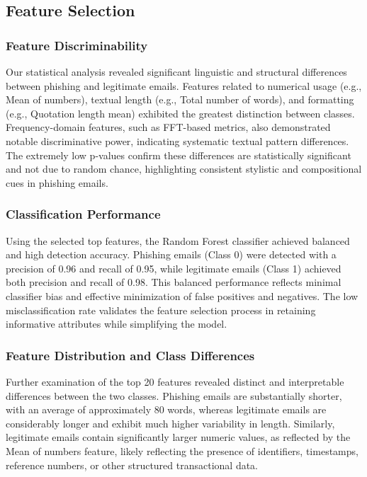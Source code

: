 \documentclass[article,pdftex,10pt,a4paper,twocolumn]{article}
\begin{document}
\subsection{Feature Selection}
\label{resultsfeatureselection}

\subsubsection{Feature Discriminability}
\label{resultsfeaturediscriminability}

Our statistical analysis revealed significant linguistic and structural differences between phishing and legitimate emails. Features related to numerical usage (e.g., Mean of numbers), textual length (e.g., Total number of words), and formatting (e.g., Quotation length mean) exhibited the greatest distinction between classes. Frequency-domain features, such as FFT-based metrics, also demonstrated notable discriminative power, indicating systematic textual pattern differences. The extremely low p-values confirm these differences are statistically significant and not due to random chance, highlighting consistent stylistic and compositional cues in phishing emails.

\subsubsection{Classification Performance}
\label{resultsclassificationperformance}

Using the selected top features, the Random Forest classifier achieved balanced and high detection accuracy. Phishing emails (Class 0) were detected with a precision of 0.96 and recall of 0.95, while legitimate emails (Class 1) achieved both precision and recall of 0.98. This balanced performance reflects minimal classifier bias and effective minimization of false positives and negatives. The low misclassification rate validates the feature selection process in retaining informative attributes while simplifying the model.

\subsubsection{Feature Distribution and Class Differences}
\label{resultsfeaturedistributionandclassdifferences}

Further examination of the top 20 features revealed distinct and interpretable differences between the two classes. Phishing emails are substantially shorter, with an average of approximately 80 words, whereas legitimate emails are considerably longer and exhibit much higher variability in length. Similarly, legitimate emails contain significantly larger numeric values, as reflected by the Mean of numbers feature, likely reflecting the presence of identifiers, timestamps, reference numbers, or other structured transactional data.
\end{document}
